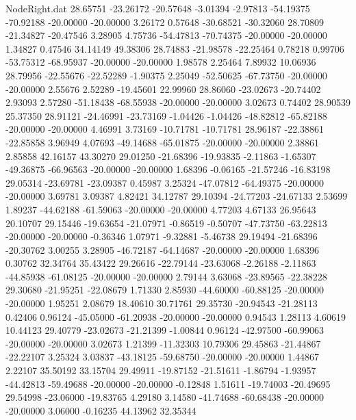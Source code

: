 \begin{filecontents}{NodeRight.dat}
  28.65751  -23.26172  -20.57648    -3.01394   -2.97813  -54.19375  -70.92188  -20.00000  -20.00000    3.26172    0.57648  -30.68521  -30.32060
  28.70809  -21.34827  -20.47546     3.28905    4.75736  -54.47813  -70.74375  -20.00000  -20.00000    1.34827    0.47546   34.14149   49.38306
  28.74883  -21.98578  -22.25464     0.78218    0.99706  -53.75312  -68.95937  -20.00000  -20.00000    1.98578    2.25464    7.89932   10.06936
  28.79956  -22.55676  -22.52289    -1.90375    2.25049  -52.50625  -67.73750  -20.00000  -20.00000    2.55676    2.52289  -19.45601   22.99960
  28.86060  -23.02673  -20.74402     2.93093    2.57280  -51.18438  -68.55938  -20.00000  -20.00000    3.02673    0.74402   28.90539   25.37350
  28.91121  -24.46991  -23.73169    -1.04426   -1.04426  -48.82812  -65.82188  -20.00000  -20.00000    4.46991    3.73169  -10.71781  -10.71781
  28.96187  -22.38861  -22.85858     3.96949    4.07693  -49.14688  -65.01875  -20.00000  -20.00000    2.38861    2.85858   42.16157   43.30270
  29.01250  -21.68396  -19.93835    -2.11863   -1.65307  -49.36875  -66.96563  -20.00000  -20.00000    1.68396   -0.06165  -21.57246  -16.83198
  29.05314  -23.69781  -23.09387     0.45987    3.25324  -47.07812  -64.49375  -20.00000  -20.00000    3.69781    3.09387    4.82421   34.12787
  29.10394  -24.77203  -24.67133     2.53699    1.89237  -44.62188  -61.59063  -20.00000  -20.00000    4.77203    4.67133   26.95643   20.10707
  29.15446  -19.63654  -21.07971    -0.86519   -0.50707  -47.73750  -63.22813  -20.00000  -20.00000   -0.36346    1.07971   -9.32881   -5.46738
  29.19494  -21.68396  -20.30762     3.00255    3.28905  -46.72187  -64.14687  -20.00000  -20.00000    1.68396    0.30762   32.34764   35.43422
  29.26616  -22.79144  -23.63068    -2.26188   -2.11863  -44.85938  -61.08125  -20.00000  -20.00000    2.79144    3.63068  -23.89565  -22.38228
  29.30680  -21.95251  -22.08679     1.71330    2.85930  -44.60000  -60.88125  -20.00000  -20.00000    1.95251    2.08679   18.40610   30.71761
  29.35730  -20.94543  -21.28113     0.42406    0.96124  -45.05000  -61.20938  -20.00000  -20.00000    0.94543    1.28113    4.60619   10.44123
  29.40779  -23.02673  -21.21399    -1.00844    0.96124  -42.97500  -60.99063  -20.00000  -20.00000    3.02673    1.21399  -11.32303   10.79306
  29.45863  -21.44867  -22.22107     3.25324    3.03837  -43.18125  -59.68750  -20.00000  -20.00000    1.44867    2.22107   35.50192   33.15704
  29.49911  -19.87152  -21.51611    -1.86794   -1.93957  -44.42813  -59.49688  -20.00000  -20.00000   -0.12848    1.51611  -19.74003  -20.49695
  29.54998  -23.06000  -19.83765     4.29180    3.14580  -41.74688  -60.68438  -20.00000  -20.00000    3.06000   -0.16235   44.13962   32.35344

\end{filecontents}
